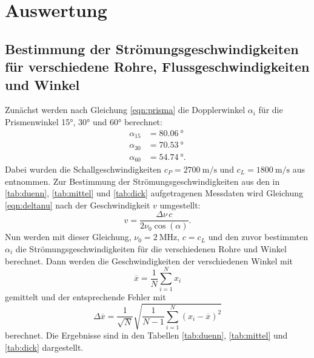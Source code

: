 \section{Auswertung}
\label{sec:Auswertung}
\subsection{Bestimmung der Strömungsgeschwindigkeiten für verschiedene Rohre, Flussgeschwindigkeiten und Winkel}
Zunächst werden nach Gleichung \eqref{eqn:prisma} die Dopplerwinkel $\alpha_i$ für die Prismenwinkel 15°, 30° und 60° berechnet:
\begin{align*}
  \alpha_{15} &= \SI{80.06}{\degree} \\
  \alpha_{30} &= \SI{70.53}{\degree} \\
  \alpha_{60} &= \SI{54.74}{\degree} .
\end{align*}
Dabei wurden die Schallgeschwindigkeiten $c_P=\SI{2700}{\metre\per\second}$ und $c_L=\SI{1800}{\metre\per\second}$ aus \cite{sample} entnommen.
Zur Bestimmung der Strömungsgeschwindigkeiten aus den in \ref{tab:duenn}, \ref{tab:mittel} und \ref{tab:dick} aufgetragenen Messdaten wird
Gleichung \eqref{eqn:deltanu} nach der Geschwindigkeit $v$ umgestellt:
\begin{equation}
  v=\frac{\Delta\nu\,c}{2 \nu_0 \cos(\alpha)} .
  \label{eqn:geschwindigkeit}
\end{equation}
Nun werden mit dieser Gleichung, $\nu_0=\SI{2}{\mega\hertz}$, $c=c_L$ und den zuvor bestimmten $\alpha_i$ die Strömungsgeschwindigkeiten für die verschiedenen Rohre
und Winkel berechnet. Dann werden die Geschwindigkeiten der verschiedenen Winkel mit
\begin{equation}
  \label{eqn:mittelwert}
  \overline{x} = \frac{1}{N} \sum_{i=1}^N x_i
\end{equation}
gemittelt und der entsprechende Fehler mit
\begin{equation}
  \label{eqn:mittelwertfehler}
  \Delta \overline{x} = \frac{1}{\sqrt{N}} \sqrt{\frac{1}{N-1} \sum_{i=1}^N (x_i - \overline{x})^2}
\end{equation}
berechnet. Die Ergebnisse sind in den Tabellen  \ref{tab:duenn}, \ref{tab:mittel} und \ref{tab:dick} dargestellt.

